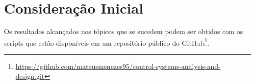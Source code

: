\section{Consideração Inicial}
Os resultados alcançados nos tópicos que se sucedem podem ser obtidos com os
scripts que estão disponíveis em um repositório público do
GitHub\footnote{\url{https://github.com/mateusmenezes95/control-systems-analysis-and-design.git}}.